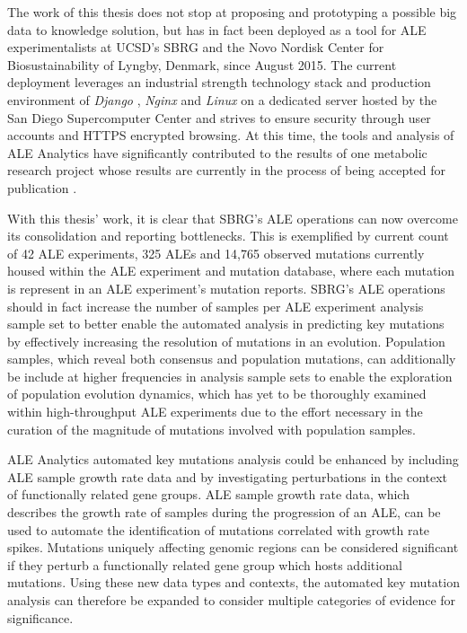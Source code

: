 \documentclass[12pt,final,masters,chapterheads]{ucsd}  %
\begin{document}
The work of this thesis does not stop at proposing and prototyping a possible big data to knowledge solution, but has in fact been deployed as a tool for ALE experimentalists at UCSD's SBRG and the Novo Nordisk Center for Biosustainability of Lyngby, Denmark, since August 2015. The current deployment leverages an industrial strength technology stack and production environment of \textit{Django} \cite{django}, \textit{Nginx} \cite{nginx} and \textit{Linux} on a dedicated server hosted by the San Diego Supercomputer Center and strives to ensure security through user accounts and HTTPS encrypted browsing. At this time, the tools and analysis of ALE Analytics have significantly contributed to the results of one metabolic research project whose results are currently in the process of being accepted for publication \cite{l-serine}.

With this thesis' work, it is clear that SBRG's ALE operations can now overcome its consolidation and reporting bottlenecks. This is exemplified by current count of 42 ALE experiments, 325 ALEs and 14,765 observed mutations currently housed within the ALE experiment and mutation database, where each mutation is represent in an ALE experiment's mutation reports. SBRG's ALE operations should in fact increase the number of samples per ALE experiment analysis sample set to better enable the automated analysis in predicting key mutations by effectively increasing the resolution of mutations in an evolution. Population samples, which reveal both consensus and population mutations, can additionally be include at higher frequencies in analysis sample sets to enable the exploration of population evolution dynamics, which has yet to be thoroughly examined within high-throughput ALE experiments due to the effort necessary in the curation of the magnitude of mutations involved with population samples.

ALE Analytics automated key mutations analysis could be enhanced by including ALE sample growth rate data and by investigating perturbations in the context of functionally related gene groups. ALE sample growth rate data, which describes the growth rate of samples during the progression of an ALE, can be used to automate the identification of mutations correlated with growth rate spikes. Mutations uniquely affecting genomic regions can be considered significant if they perturb a functionally related gene group which hosts additional mutations. Using these new data types and contexts, the automated key mutation analysis can therefore be expanded to consider multiple categories of evidence for significance.
\end{document}
